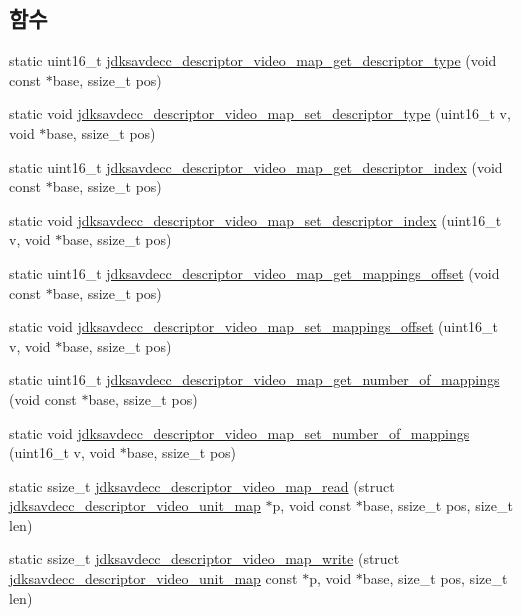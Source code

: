 \subsection*{함수}
\begin{DoxyCompactItemize}
\item 
static uint16\+\_\+t \hyperlink{group__descriptor__video__map_ga34cea2c8475af9c7b8092f7e02fce3a9}{jdksavdecc\+\_\+descriptor\+\_\+video\+\_\+map\+\_\+get\+\_\+descriptor\+\_\+type} (void const $\ast$base, ssize\+\_\+t pos)
\item 
static void \hyperlink{group__descriptor__video__map_ga795d311fdf631cb5195891d231bae1af}{jdksavdecc\+\_\+descriptor\+\_\+video\+\_\+map\+\_\+set\+\_\+descriptor\+\_\+type} (uint16\+\_\+t v, void $\ast$base, ssize\+\_\+t pos)
\item 
static uint16\+\_\+t \hyperlink{group__descriptor__video__map_ga5ca5cd6a5dfc92ba7d64d944b7350c05}{jdksavdecc\+\_\+descriptor\+\_\+video\+\_\+map\+\_\+get\+\_\+descriptor\+\_\+index} (void const $\ast$base, ssize\+\_\+t pos)
\item 
static void \hyperlink{group__descriptor__video__map_ga855bc95bb9268073111c983176bf61c9}{jdksavdecc\+\_\+descriptor\+\_\+video\+\_\+map\+\_\+set\+\_\+descriptor\+\_\+index} (uint16\+\_\+t v, void $\ast$base, ssize\+\_\+t pos)
\item 
static uint16\+\_\+t \hyperlink{group__descriptor__video__map_ga10f05b897f70767280f5706a83865248}{jdksavdecc\+\_\+descriptor\+\_\+video\+\_\+map\+\_\+get\+\_\+mappings\+\_\+offset} (void const $\ast$base, ssize\+\_\+t pos)
\item 
static void \hyperlink{group__descriptor__video__map_ga87847b4eaa2bc998af1f77efb81cde8a}{jdksavdecc\+\_\+descriptor\+\_\+video\+\_\+map\+\_\+set\+\_\+mappings\+\_\+offset} (uint16\+\_\+t v, void $\ast$base, ssize\+\_\+t pos)
\item 
static uint16\+\_\+t \hyperlink{group__descriptor__video__map_gad8f4c16046d4619731beaf777eaaaed5}{jdksavdecc\+\_\+descriptor\+\_\+video\+\_\+map\+\_\+get\+\_\+number\+\_\+of\+\_\+mappings} (void const $\ast$base, ssize\+\_\+t pos)
\item 
static void \hyperlink{group__descriptor__video__map_ga19a122dc1995abd7de5fd15f354b40d1}{jdksavdecc\+\_\+descriptor\+\_\+video\+\_\+map\+\_\+set\+\_\+number\+\_\+of\+\_\+mappings} (uint16\+\_\+t v, void $\ast$base, ssize\+\_\+t pos)
\item 
static ssize\+\_\+t \hyperlink{group__descriptor__video__map_ga3252eb1bbd7858899721a08add38f093}{jdksavdecc\+\_\+descriptor\+\_\+video\+\_\+map\+\_\+read} (struct \hyperlink{structjdksavdecc__descriptor__video__unit__map}{jdksavdecc\+\_\+descriptor\+\_\+video\+\_\+unit\+\_\+map} $\ast$p, void const $\ast$base, ssize\+\_\+t pos, size\+\_\+t len)
\item 
static ssize\+\_\+t \hyperlink{group__descriptor__video__map_ga7a7eed2548c797b0ed8db1e33bb77c9a}{jdksavdecc\+\_\+descriptor\+\_\+video\+\_\+map\+\_\+write} (struct \hyperlink{structjdksavdecc__descriptor__video__unit__map}{jdksavdecc\+\_\+descriptor\+\_\+video\+\_\+unit\+\_\+map} const $\ast$p, void $\ast$base, size\+\_\+t pos, size\+\_\+t len)
\end{DoxyCompactItemize}


